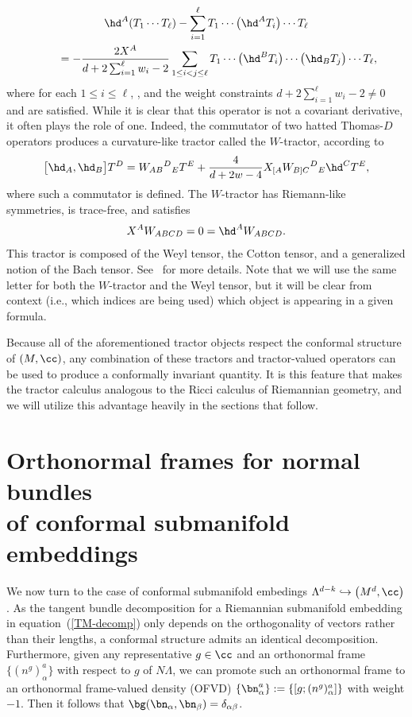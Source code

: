 \begin{gather*}
\hd^A (T_1 \cdots T_\ell) - \sum_{i=1}^\ell T_1 \cdots \bigl(\hd^A T_i\bigr) \cdots T_\ell \\
\qquad{}= - \frac{2 X^A}{d+2 \sum_{i=1}^\ell w_i -2} \sum_{1 \leq i < j \leq \ell} T_1 \cdots \bigl(\hd^B T_i\bigr) \cdots \bigl(\hd_B T_j\bigr) \cdots T_\ell ,
\end{gather*}
where for each $1 \leq i \leq \ell$, , and the weight constraints $d+2\sum_{i=1}^{\ell} w_i - 2 \neq 0$ and  are satisfied.
While it is clear that this operator is not a covariant derivative, it often plays the role of one. Indeed, the commutator of two hatted Thomas-$D$ operators produces a curvature-like tractor called the $W$-tractor, according to
\[\bigl[\hd_A, \hd_B\bigr] T^D = W_{AB}{}^D{}_E T^E + \frac{4}{d+2w-4} X_{[A} W_{B] C}{}^D{}_E \hd^C T^E ,\]
where such a commutator is defined. The $W$-tractor has Riemann-like symmetries, is trace-free, and satisfies
\[X^A W_{ABCD} = 0 = \hd^A W_{ABCD} .\]
This tractor is composed of the Weyl tensor, the Cotton tensor, and a generalized notion of the Bach tensor. See~\cite{BGW1, GOmin} for more details. Note that we will use the same letter for both the $W$-tractor and the Weyl tensor, but it will be clear from context (i.e., which indices are being used) which object is appearing in a given formula.

Because all of the aforementioned tractor objects respect the conformal structure of $(M,\cc)$, any combination of these tractors and tractor-valued operators can be used to produce a conformally invariant quantity. It is this feature that makes the tractor calculus analogous to the Ricci calculus of Riemannian geometry, and we will utilize this advantage heavily in the sections that follow.

\section[Orthonormal frames for normal bundles of conformal submanifold embeddings]{Orthonormal frames for normal bundles\\ of conformal submanifold embeddings} \label{conf-frames}
We now turn to the case of conformal submanifold embedings $\Lambda^{d-k} \hookrightarrow \bigl(M^d,\cc\bigr)$. As the tangent bundle decomposition for a Riemannian submanifold embedding in equation~(\ref{TM-decomp}) only depends on the orthogonality of vectors rather than their lengths, a conformal structure admits an identical decomposition. Furthermore, given any representative $g \in \cc$ and an orthonormal frame $\{(n^g)^a_{\alpha}\}$ with respect to $g$ of $N \Lambda$, we can promote such an orthonormal frame to an orthonormal frame-valued density (OFVD) $\{\bn^a_{\alpha}\} := \{[g ; (n^g)^a_{\alpha}]\}$ with weight $-1$. Then it follows that $\bg(\bn_{\alpha}, \bn_{\beta}) = \delta_{\alpha \beta}$.

